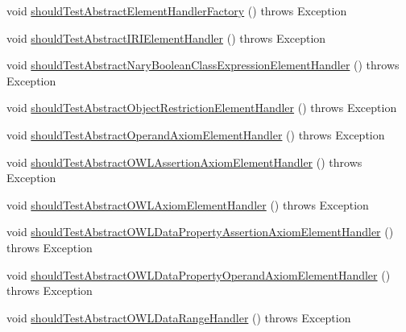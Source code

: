 \begin{DoxyCompactItemize}
\item 
void \hyperlink{classorg_1_1semanticweb_1_1owlapi_1_1contract_1_1_contract_owlxmlparser_test_af5eda5999345a64674257b0474968e30}{should\-Test\-Abstract\-Element\-Handler\-Factory} ()  throws Exception 
\item 
void \hyperlink{classorg_1_1semanticweb_1_1owlapi_1_1contract_1_1_contract_owlxmlparser_test_a68325a4cc4168517c3ba4a522eecc5f2}{should\-Test\-Abstract\-I\-R\-I\-Element\-Handler} ()  throws Exception 
\item 
void \hyperlink{classorg_1_1semanticweb_1_1owlapi_1_1contract_1_1_contract_owlxmlparser_test_ab87cc78dcd833ff965782c309a317421}{should\-Test\-Abstract\-Nary\-Boolean\-Class\-Expression\-Element\-Handler} ()  throws Exception 
\item 
void \hyperlink{classorg_1_1semanticweb_1_1owlapi_1_1contract_1_1_contract_owlxmlparser_test_a67576ea547740b69498b7628b86c485f}{should\-Test\-Abstract\-Object\-Restriction\-Element\-Handler} ()  throws Exception 
\item 
void \hyperlink{classorg_1_1semanticweb_1_1owlapi_1_1contract_1_1_contract_owlxmlparser_test_a7ffc026e5d9957f91712d3af2db7df49}{should\-Test\-Abstract\-Operand\-Axiom\-Element\-Handler} ()  throws Exception 
\item 
void \hyperlink{classorg_1_1semanticweb_1_1owlapi_1_1contract_1_1_contract_owlxmlparser_test_a9846b9d898c9541c259c99c21bf644ea}{should\-Test\-Abstract\-O\-W\-L\-Assertion\-Axiom\-Element\-Handler} ()  throws Exception 
\item 
void \hyperlink{classorg_1_1semanticweb_1_1owlapi_1_1contract_1_1_contract_owlxmlparser_test_a2ddb61b7060afd4c12956b31946ae813}{should\-Test\-Abstract\-O\-W\-L\-Axiom\-Element\-Handler} ()  throws Exception 
\item 
void \hyperlink{classorg_1_1semanticweb_1_1owlapi_1_1contract_1_1_contract_owlxmlparser_test_a1e248fed6d78d664f0a4aa7ed728cf4d}{should\-Test\-Abstract\-O\-W\-L\-Data\-Property\-Assertion\-Axiom\-Element\-Handler} ()  throws Exception 
\item 
void \hyperlink{classorg_1_1semanticweb_1_1owlapi_1_1contract_1_1_contract_owlxmlparser_test_afe40a1925cb924a8214b5353517c16eb}{should\-Test\-Abstract\-O\-W\-L\-Data\-Property\-Operand\-Axiom\-Element\-Handler} ()  throws Exception 
\item 
void \hyperlink{classorg_1_1semanticweb_1_1owlapi_1_1contract_1_1_contract_owlxmlparser_test_a523e24300285a2c508de318a88946786}{should\-Test\-Abstract\-O\-W\-L\-Data\-Range\-Handler} ()  throws Exception 

\end{DoxyCompactItemize}
